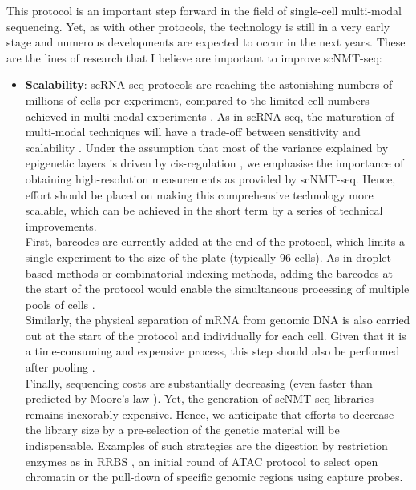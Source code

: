 This protocol is an important step forward in the field of single-cell multi-modal sequencing. Yet, as with other protocols, the technology is still in a very early stage and numerous developments are expected to occur in the next years. These are the lines of research that I believe are important to improve scNMT-seq:

\begin{itemize}

	\item \textbf{Scalability}: scRNA-seq protocols are reaching the astonishing numbers of millions of cells per experiment, compared to the limited cell numbers achieved in multi-modal experiments \cite{Cao2019,Cao2018,Guo2017}. As in scRNA-seq, the maturation of multi-modal techniques will have a trade-off between sensitivity and scalability \cite{Chappell2018}. Under the assumption that most of the variance explained by epigenetic layers is driven by cis-regulation \cite{Bell2011}, we emphasise the importance of obtaining high-resolution measurements as provided by scNMT-seq. Hence, effort should be placed on making this comprehensive technology more scalable, which can be achieved in the short term by a series of technical improvements.\\
	First, barcodes are currently added at the end of the protocol, which limits a single experiment to the size of the plate (typically 96 cells). As in droplet-based methods or combinatorial indexing methods, adding the barcodes at the start of the protocol would enable the simultaneous processing of multiple pools of cells \cite{DR-seq,Mulqueen2018}.\\
	Similarly, the physical separation of mRNA from genomic DNA is also carried out at the start of the protocol and individually for each cell. Given that it is a time-consuming and expensive process, this step should also be performed after pooling \cite{DR-seq}.\\
	Finally, sequencing costs are substantially decreasing (even faster than predicted by Moore's law \cite{Svensson2018}). Yet, the generation of scNMT-seq libraries remains inexorably expensive. Hence, we anticipate that efforts to decrease the library size by a pre-selection of the genetic material will be indispensable. Examples of such strategies are the digestion by restriction enzymes as in RRBS \cite{Guo2013}, an initial round of ATAC protocol to select open chromatin \cite{Spektor2018} or the pull-down of specific genomic regions using capture probes.


\end{itemize}
